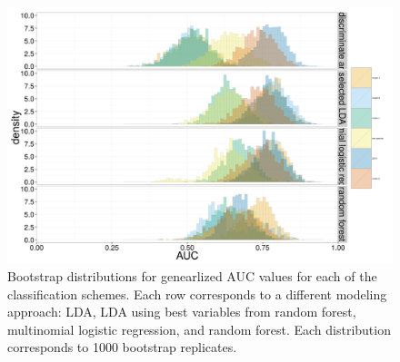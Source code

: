 \documentclass[12pt,letterpaper]{article}
\begin{document}
\begin{figure}[ht]
  \centering
  \includegraphics[height = \textheight, width = \textwidth, keepaspectratio = true]{figure/gen_res}
  \caption{Bootstrap distributions for genearlized AUC values for each of the classification schemes. Each row corresponds to a different modeling approach: LDA, LDA using best variables from random forest, multinomial logistic regression, and random forest. Each distribution corresponds to 1000 bootstrap replicates.}
  \label{fig:gen_hist}
\end{figure}
\end{document}
